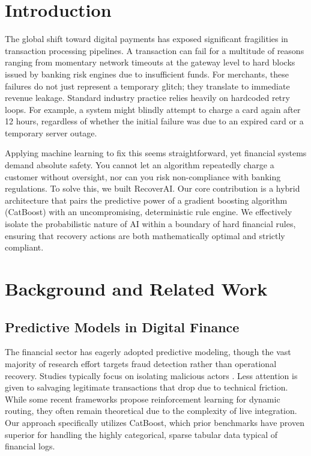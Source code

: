 \documentclass[conference]{IEEEtran}
\begin{document}
\section{Introduction}
The global shift toward digital payments has exposed significant fragilities in transaction processing pipelines. A transaction can fail for a multitude of reasons ranging from momentary network timeouts at the gateway level to hard blocks issued by banking risk engines due to insufficient funds. For merchants, these failures do not just represent a temporary glitch; they translate to immediate revenue leakage. Standard industry practice relies heavily on hardcoded retry loops. For example, a system might blindly attempt to charge a card again after 12 hours, regardless of whether the initial failure was due to an expired card or a temporary server outage.

Applying machine learning to fix this seems straightforward, yet financial systems demand absolute safety. You cannot let an algorithm repeatedly charge a customer without oversight, nor can you risk non-compliance with banking regulations. To solve this, we built RecoverAI. Our core contribution is a hybrid architecture that pairs the predictive power of a gradient boosting algorithm (CatBoost) with an uncompromising, deterministic rule engine. We effectively isolate the probabilistic nature of AI within a boundary of hard financial rules, ensuring that recovery actions are both mathematically optimal and strictly compliant. 

\section{Background and Related Work}

\subsection{Predictive Models in Digital Finance}
The financial sector has eagerly adopted predictive modeling, though the vast majority of research effort targets fraud detection rather than operational recovery. Studies typically focus on isolating malicious actors \cite{ref1, ref2}. Less attention is given to salvaging legitimate transactions that drop due to technical friction. While some recent frameworks propose reinforcement learning for dynamic routing, they often remain theoretical due to the complexity of live integration. Our approach specifically utilizes CatBoost, which prior benchmarks \cite{ref3} have proven superior for handling the highly categorical, sparse tabular data typical of financial logs.
\end{document}

